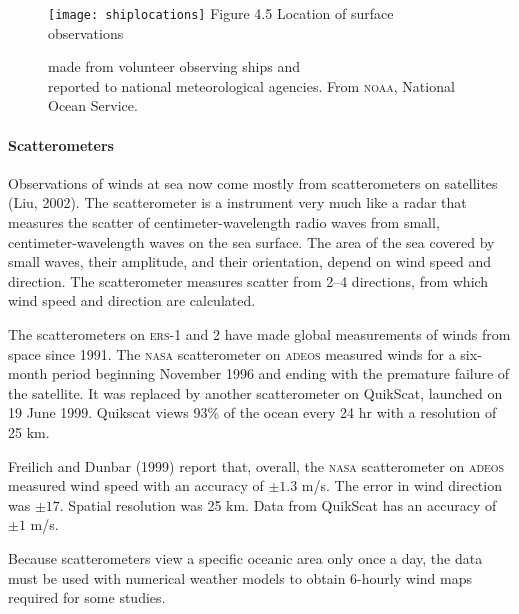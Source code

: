 \begin{figure}[t!]
\centering
\texttt{[image: shiplocations]}
\footnotesize
Figure 4.5 Location of surface observations \rule{0mm}{3ex}made from
volunteer observing ships and\\ reported to national meteorological
agencies. From \textsc{noaa}, National Ocean Service.

\label{fig:shiplocations}
\vspace{-4ex}
\end{figure}

\paragraph{Scatterometers}
 Observations of
winds at sea now come mostly from scatterometers on satellites (Liu,
2002). The scatterometer is a instrument very much like a radar that
measures the scatter of centimeter-wavelength radio waves from small,
centimeter-wavelength waves on the sea surface. The area of the sea
covered by small waves, their amplitude, and their orientation, depend
on wind speed and direction. The scatterometer measures scatter from
2--4 directions, from which wind speed and direction are calculated.

The scatterometers on \textsc{ers-1} and 2 have made global
measurements of winds from space since 1991. The \textsc{nasa}
scatterometer on \textsc{adeos} measured winds
for a six-month period beginning November 1996 and ending with the
premature failure of the satellite. It was replaced by another
scatterometer on QuikScat, launched on 19 June
1999. Quikscat views 93\% of the ocean
every 24 hr with a resolution of 25 km.

Freilich and Dunbar (1999) report that, overall, the \textsc{nasa}
scatterometer on \textsc{adeos}
measured wind speed with an
accuracy of $\pm 1.3$ m/s. The
error in wind direction was $\pm17$\degrees. Spatial resolution was 25
km.  Data from QuikScat has an accuracy of $\pm 1$ m/s.

Because scatterometers view a specific oceanic
area only once a day, the data must be used with numerical weather
models to obtain 6-hourly wind maps required for some studies.

